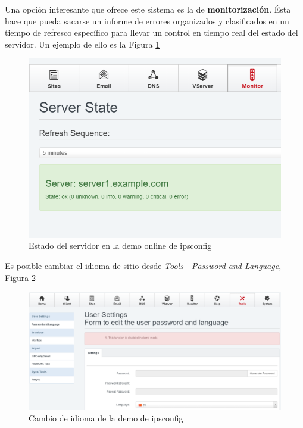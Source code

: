 Una opción interesante que ofrece este sistema es la de \textbf{monitorización}.
Ésta hace que pueda sacarse un informe de errores organizados y clasificados en un tiempo de refresco específico para llevar un control en tiempo real del estado del servidor. Un ejemplo de ello es la Figura  \ref{fig:figura72}

\begin{figure}[H] %
	\centering
	\includegraphics[scale=0.4]{figuras/figura72.png} 
	\caption{Estado del servidor en la demo online de ipsconfig}
	\label{fig:figura72}
\end{figure}

Es posible cambiar el idioma de sitio desde \textit{Tools} - \textit{Password and Language}, Figura \ref{fig:figura74} 

\begin{figure}[H] %
	\centering
	\includegraphics[scale=0.3]{figuras/figura74.png} 
	\caption{Cambio de idioma de la demo de ipsconfig}
	\label{fig:figura74}
\end{figure}

